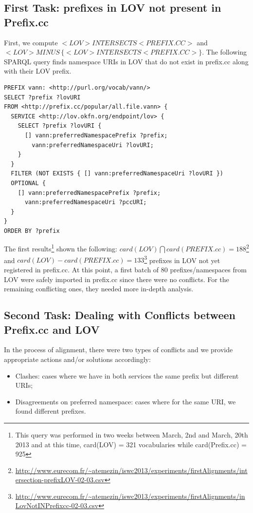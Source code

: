 \subsection{First Task: prefixes in LOV not present in Prefix.cc}  \label{sec:notInPrefix}
First, we compute $<LOV> INTERSECTS <PREFIX.CC>$ and $<LOV> MINUS \, \{<LOV> INTERSECTS <PREFIX.CC> \}$. The following SPARQL query finds namespace URIs in LOV that do not exist in prefix.cc along with their LOV prefix.
\begin{verbatim}
PREFIX vann: <http://purl.org/vocab/vann/>
SELECT ?prefix ?lovURI
FROM <http://prefix.cc/popular/all.file.vann> {
  SERVICE <http://lov.okfn.org/endpoint/lov> {
    SELECT ?prefix ?lovURI {
      [] vann:preferredNamespacePrefix ?prefix;
        vann:preferredNamespaceUri ?lovURI;
    }
  }
  FILTER (NOT EXISTS { [] vann:preferredNamespaceUri ?lovURI })
  OPTIONAL {
    [] vann:preferredNamespacePrefix ?prefix;
      vann:preferredNamespaceUri ?pccURI;
  }
}
ORDER BY ?prefix
\end{verbatim}
The first results\footnote{This query was performed in two weeks between March, 2nd and March, 20th 2013 and at this time, card(LOV) = 321 vocabularies while card(Prefix.cc) = 925} shown the following: $card(LOV) \bigcap card(PREFIX.cc) = 188$\footnote{\url{http://www.eurecom.fr/~atemezin/iswc2013/experiments/firstAlignments/intersection-prefixLOV-02-03.csv}} and $card (LOV) - card( PREFIX.cc) = 133$\footnote{\url{http://www.eurecom.fr/~atemezin/iswc2013/experiments/firstAlignments/inLovNotINPrefixcc-02-03.csv}} prefixes in LOV not yet registered in prefix.cc. At this point, a first batch of $80$ prefixes/namespaces from LOV were safely imported in prefix.cc since there were no conflicts. For the remaining conflicting ones, they needed more in-depth analysis.

\subsection{Second Task: Dealing with Conflicts between Prefix.cc and LOV}  \label{sec:conflicts}
In the process of alignment, there were two types of conflicts and we provide appropriate actions and/or solutions accordingly:
\begin{itemize}
 \item Clashes: cases where we have in both services the same prefix but different URIs;
 \item Disagreements on preferred namespace: cases where for the same URI, we found different prefixes.
\end{itemize}


